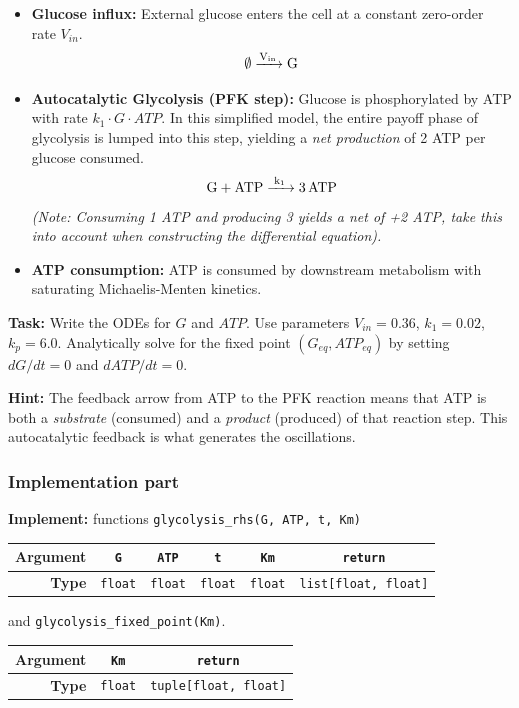 \documentclass[11pt]{article}
\begin{document}
\begin{itemize}
    \item \textbf{Glucose influx:} External glucose enters the cell at a constant zero-order rate $V_{in}$.
    $$ \emptyset\ce{->[V_{in}] G} $$
    
    \item \textbf{Autocatalytic Glycolysis (PFK step):} Glucose is phosphorylated by ATP with rate $k_1 \cdot G \cdot ATP$. In this simplified model, the entire payoff phase of glycolysis is lumped into this step, yielding a \emph{net production} of 2 ATP per glucose consumed.
    $$ \ce{G + ATP ->[k_1] 3 ATP} $$
    \emph{(Note: Consuming 1 ATP and producing 3 yields a net of +2 ATP, take this into account when constructing the differential equation).}
    
    \item \textbf{ATP consumption:} ATP is consumed by downstream metabolism with saturating Michaelis-Menten kinetics.
    \begin{center}
    	
    \end{center}
\end{itemize}

\textbf{Task:} Write the ODEs for $G$ and $ATP$. Use parameters $V_{in} = 0.36$, $k_1 = 0.02$, $k_p = 6.0$. Analytically solve for the fixed point $(G_{eq}, ATP_{eq})$ by setting $dG/dt = 0$ and $dATP/dt = 0$.

\textbf{Hint:} The feedback arrow from ATP to the PFK reaction means that ATP is both a \emph{substrate} (consumed) and a \emph{product} (produced) of that reaction step. This autocatalytic feedback is what generates the oscillations.

\subsubsection*{Implementation part}
\textbf{Implement:} functions \lstinline|glycolysis_rhs(G, ATP, t, Km)|
\begin{center}
\renewcommand{\arraystretch}{2.0}
\begin{tabular}{r | c | c | c | c | c}
\toprule
\textbf{Argument} & \lstinline|G| & \lstinline|ATP| & \lstinline|t| & \lstinline|Km| & \lstinline|return| \\ \midrule
\textbf{Type} & \lstinline|float| & \lstinline|float| & \lstinline|float| & \lstinline|float| & \lstinline|list[float, float]| \\
\bottomrule
\end{tabular}
\end{center}
and \lstinline|glycolysis_fixed_point(Km)|.
\vspace{0.2cm}
\begin{center}
\renewcommand{\arraystretch}{2.0}
\begin{tabular}{r | c | c}
\toprule
\textbf{Argument} & \lstinline|Km| & \lstinline|return| \\ \midrule
\textbf{Type} & \lstinline|float| & \lstinline|tuple[float, float]| \\
\bottomrule
\end{tabular}
\end{center}
\end{document}
